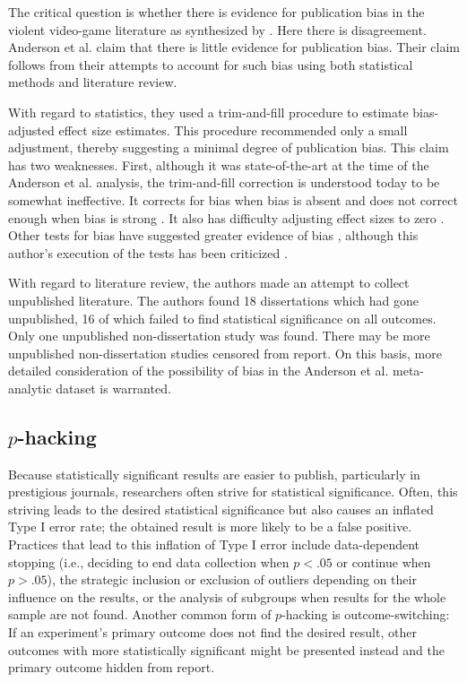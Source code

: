 \documentclass[man, mask]{apa6}
\begin{document}
The critical question is whether there is evidence for publication bias in the violent video-game literature as synthesized by \citet{Anderson:etal:2010}.  Here there is disagreement.  Anderson et al. claim that there is little evidence for publication bias.  Their claim follows from their attempts to account for such bias using both statistical methods and literature review.  

With regard to statistics, they used a  trim-and-fill procedure to estimate bias-adjusted effect size estimates. This procedure recommended only a small adjustment, thereby suggesting a minimal degree of publication bias. This claim has two weaknesses. First, although it was state-of-the-art at the time of the Anderson et al. analysis, the trim-and-fill correction is understood today to be somewhat ineffective. It corrects for bias when bias is absent and does not correct enough when bias is strong \citep{Simonsohn:etal:2014b}. It also has difficulty adjusting effect sizes to zero \citep{CITATION NEEDED!}. Other tests for bias have suggested greater evidence of bias \citep{Ferguson:2007}, although this author's execution of the tests has been criticized \citep[see][]{Anderson:etal:2010}. 

With regard to literature review, the authors made an attempt to collect unpublished literature. The authors found 18 dissertations which had gone unpublished, 16 of which failed to find statistical significance on all outcomes. Only one unpublished non-dissertation study was found. There may be more unpublished non-dissertation studies censored from report. On this basis, more detailed consideration of the possibility of bias in the Anderson et al. meta-analytic dataset is warranted.

\subsection{$p$-hacking}
Because statistically significant results are easier to publish, particularly in prestigious journals, researchers often strive for statistical significance. Often, this striving leads to the desired statistical significance but also causes an inflated Type I error rate; the obtained result is more likely to be a false positive. Practices that lead to this inflation of Type I error include data-dependent stopping (i.e., deciding to end data collection when $p < .05$ or continue when $p > .05$), the strategic inclusion or exclusion of outliers depending on their influence on the results, or the analysis of subgroups when results for the whole sample are not found. Another common form of $p$-hacking is outcome-switching: If an experiment's primary outcome does not find the desired result, other outcomes with more statistically significant might be presented instead and the primary outcome hidden from report.
\end{document}
